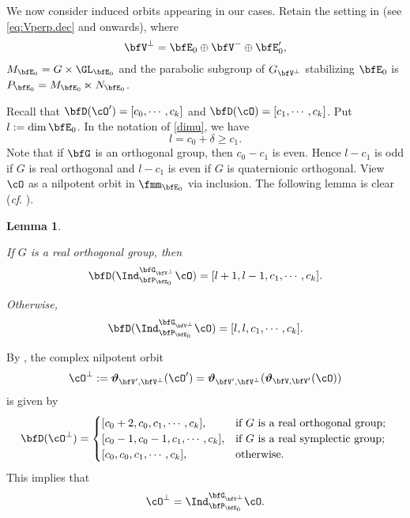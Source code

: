 \documentclass[12pt,a4paper]{amsart}
\numberwithin{equation}{section}
\newtheorem{lem}[thm]{Lemma}
\theoremstyle{remark}
\def\abfV{\bfV'}
\def\Thetab{\bar{\Theta}}
\def\acO{{\cO'}}
\def\bfVpe{\bfV^\perp}
\def\bfEz{\bfE_0}
\def\bfVn{\bfV^-}
\def\bfEzp{\bfE'_0}
\begin{document}
We now consider induced orbits appearing in our cases.
Retain the setting in  (see \cref{eq:Vperp.dec} and onwards), where
\[
\bfVpe = \bfEz \oplus \bfVn \oplus \bfEzp,
\]
$M_{\bfE_0}=G
\times \GL_{\bfE_0}$ and
the parabolic subgroup of $G_{\bfV^\perp}$ stabilizing
$\bfE_0$ is $P_{\bfE_0}=M_{\bfE_0}\ltimes N_{\bfE_0}$.


%
Recall that $\bfD(\acO) =[c_0, \cdots, c_k]$  and $\bfD(\cO) = [c_1,\cdots, c_k]$.
Put $l :=\dim \bfEz$. In the notation of \eqref{dimu}, we have
\begin{equation}\label{eq:dim-ine}
  l=c_0+\delta\geq c_1.
\end{equation}
Note that if $\bfG$ is an orthogonal group, then $c_0-c_1$ is even. Hence $l-c_1$ is odd if $G$ is real orthogonal and $l-c_1$ is even if $G$ is quaternionic orthogonal. View $\cO$ as a nilpotent orbit in $\fmm_{\bfE_0}$ via inclusion.
The following lemma is clear (\emph{cf}. \cite[Section~7.3]{CM}).
\begin{lem}\label{lem:indC}
\begin{enumT}
\item \label{it:indC.1}
If $G$ is a real orthogonal group, then
\[
\bfD(\Ind_{\bfP_{\bfEz}}^{\bfG_{\bfVpe}}\cO) = [l+1,l-1, c_1, \cdots, c_k].
\]
\item \label{it:indC.2}
Otherwise,
\[
  \bfD(\Ind_{\bfP_{\bfEz}}^{\bfG_{\bfVpe}}\cO) = [l,l, c_1,\cdots, c_k].
\]
\end{enumT}
\end{lem}

\medskip




By  \cite[Theorem~5.2 and 5.6]{DKPC}, the complex nilpotent orbit
\[\cO^\perp:=\oliftc_{\abfV,\bfVpe}(\acO)= \oliftc_{\abfV,\bfVpe}(\oliftc_{\bfV,\abfV}(\cO))\]
is given by
\[
  \bfD(\cO^\perp )= \begin{cases}
  [c_0+2, c_0, c_1, \cdots, c_k], &\text{if $G$ is a real orthogonal group;}\\
  [c_0-1,  c_0-1, c_1, \cdots, c_k],&\text{if $G$ is a real symplectic group; }\\
  [c_0, c_0, c_1, \cdots, c_k], &\text{otherwise.}
    \end{cases}
  \]
This implies that
\[
  \cO^\perp = \Ind_{\bfP_{\bfEz}}^{\bfG_{\bfVpe}}\cO.
\]
\end{document}
